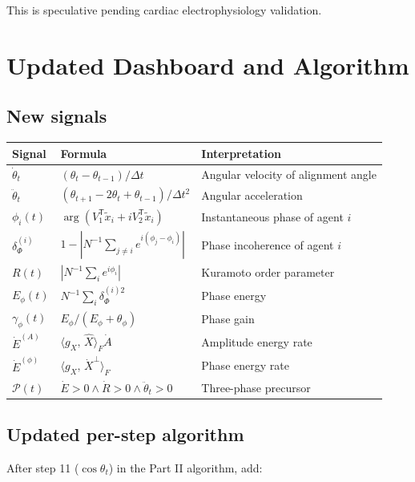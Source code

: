 \documentclass[11pt,a4paper]{article}
\theoremstyle{definition}
\newcommand{\T}{^{\mathsf{T}}}
\newcommand{\inner}[2]{\langle #1,\,#2\rangle}
\newcommand{\gX}{g_X}
\begin{document}
This is speculative pending cardiac electrophysiology validation.

\section{Updated Dashboard and Algorithm}

\subsection{New signals}

\begin{center}
\renewcommand{\arraystretch}{1.3}
\begin{tabular}{lll}
\toprule
Signal & Formula & Interpretation \\
\midrule
$\dot\theta_t$ & $(\theta_t - \theta_{t-1})/\Delta t$ & Angular velocity of alignment angle \\
$\ddot\theta_t$ & $(\theta_{t+1} - 2\theta_t + \theta_{t-1})/\Delta t^2$ & Angular acceleration \\
$\phi_i(t)$ & $\arg(V_1\T\tilde x_i + iV_2\T\tilde x_i)$ & Instantaneous phase of agent $i$ \\
$\delta_\Phi^{(i)}$ & $1 - |N^{-1}\sum_{j\neq i}e^{i(\phi_j-\phi_i)}|$ & Phase incoherence of agent $i$ \\
$R(t)$ & $|N^{-1}\sum_i e^{i\phi_i}|$ & Kuramoto order parameter \\
$E_\phi(t)$ & $N^{-1}\sum_i \delta_\Phi^{(i)2}$ & Phase energy \\
$\gamma_\phi(t)$ & $E_\phi/(E_\phi+\theta_\phi)$ & Phase gain \\
$\dot E^{(A)}$ & $\inner{\gX}{\hat X}_F\dot A$ & Amplitude energy rate \\
$\dot E^{(\phi)}$ & $\inner{\gX}{\dot X^\perp}_F$ & Phase energy rate \\
$\mathcal{P}(t)$ & $\dot E>0 \wedge \dot R>0 \wedge \ddot\theta_t>0$ & Three-phase precursor \\
\bottomrule
\end{tabular}
\end{center}

\subsection{Updated per-step algorithm}

After step 11 ($\cos\theta_t$) in the Part II algorithm, add:
\end{document}

